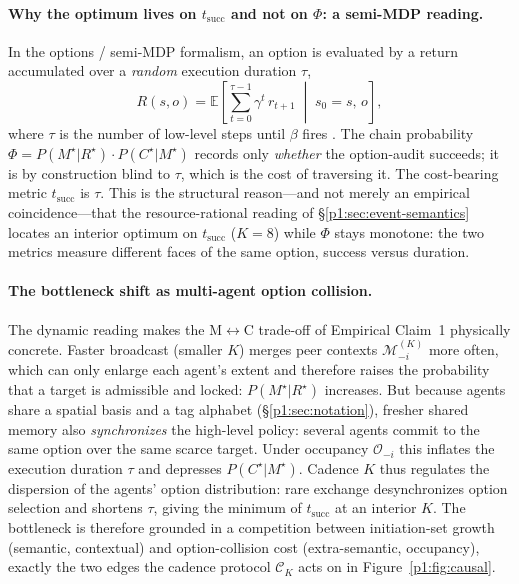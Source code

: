\documentclass{article}
\begin{document}
\paragraph{Why the optimum lives on $t_{\mathrm{succ}}$ and not on $\Phi$: a semi-MDP reading.}
In the options / semi-MDP formalism, an option is evaluated by a
return accumulated over a \emph{random} execution duration $\tau$,
\[
R(s,o)=\mathbb{E}\!\left[\textstyle\sum_{t=0}^{\tau-1}\gamma^{t}\,r_{t+1}\;\middle|\;s_0=s,\,o\right],
\]
where $\tau$ is the number of low-level steps until $\beta$ fires
\citep{sutton1999between}. The chain probability
$\Phi=P(M^\star|R^\star)\!\cdot\!P(C^\star|M^\star)$ records only
\emph{whether} the option-audit succeeds; it is by construction blind to
$\tau$, which is the cost of traversing it. The cost-bearing metric
$t_{\mathrm{succ}}$ is $\tau$. This is the structural reason---and not
merely an empirical coincidence---that the resource-rational reading of
\S\ref{p1:sec:event-semantics} \citep{lieder2020resource} locates an
interior optimum on $t_{\mathrm{succ}}$ ($K{=}8$) while $\Phi$ stays
monotone: the two metrics measure different faces of the same option,
success versus duration.

\paragraph{The bottleneck shift as multi-agent option collision.}
The dynamic reading makes the M$\leftrightarrow$C trade-off of
Empirical Claim~1 physically concrete. Faster broadcast (smaller $K$)
merges peer contexts $\mathcal{M}^{(K)}_{-i}$ more often, which can only
enlarge each agent's extent and therefore raises the probability that a
target is admissible and locked: $P(M^\star|R^\star)$ increases. But
because agents share a spatial basis and a tag alphabet
(\S\ref{p1:sec:notation}), fresher shared memory also \emph{synchronizes}
the high-level policy: several agents commit to the same option over the
same scarce target. Under occupancy $\mathcal{O}_{-i}$ this inflates the
execution duration $\tau$ and depresses $P(C^\star|M^\star)$. Cadence
$K$ thus regulates the dispersion of the agents' option distribution:
rare exchange desynchronizes option selection and shortens $\tau$,
giving the minimum of $t_{\mathrm{succ}}$ at an interior $K$. The
bottleneck is therefore grounded in a competition between
initiation-set growth (semantic, contextual) and option-collision cost
(extra-semantic, occupancy), exactly the two edges the cadence protocol
$\mathcal{C}_K$ acts on in Figure~\ref{p1:fig:causal}.
\end{document}
